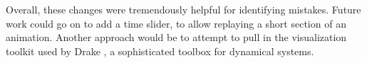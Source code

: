 \documentclass[main.tex]{subfiles}
\begin{document}

Overall, these changes were tremendously helpful for identifying mistakes.
Future work could go on to add a time slider, to allow replaying a short section of an animation. Another approach would be to attempt to pull in the visualization toolkit used by Drake \cite{drake}, a sophisticated toolbox for dynamical systems.

\end{document}
